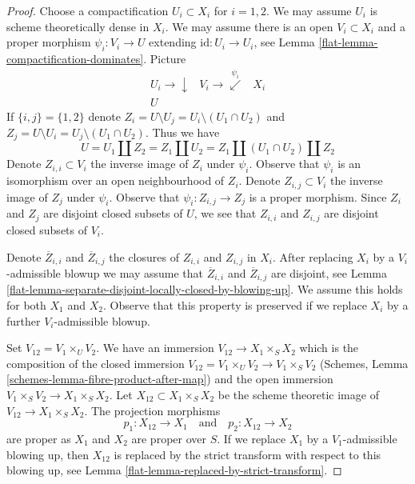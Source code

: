 \begin{proof}

Choose a compactification $U_i \subset X_i$ for $i = 1, 2$. We may
assume $U_i$ is scheme theoretically dense in $X_i$. We may assume there
is an open $V_i \subset X_i$ and a proper morphism
$\psi_i : V_i \to U$ extending $\text{id} : U_i \to U_i$, see
Lemma \ref{flat-lemma-compactification-dominates}. Picture
$$
\begin{array}{ccc}U_i \longrightarrow\downarrow & V_i \longrightarrow\overset{\psi_i}{\swarrow} & X_i \\ U &  & \end{array}
$$
If $\{i, j\} = \{1, 2\}$ denote
$Z_i = U \setminus U_j = U_i \setminus (U_1 \cap U_2)$
and
$Z_j = U \setminus U_i = U_j \setminus (U_1 \cap U_2)$.
Thus we have
$$
U = U_1 \amalg Z_2 = Z_1 \amalg U_2 = Z_1 \amalg (U_1 \cap U_2) \amalg Z_2
$$
Denote $Z_{i, i} \subset V_i$ the inverse image of $Z_i$ under $\psi_i$.
Observe that $\psi_i$ is an isomorphism over an open neighbourhood of $Z_i$.
Denote $Z_{i, j} \subset V_i$ the inverse image of $Z_j$ under $\psi_i$.
Observe that $\psi_i : Z_{i, j} \to Z_j$ is a proper morphism.
Since $Z_i$ and $Z_j$ are disjoint closed subsets of
$U$, we see that $Z_{i, i}$ and $Z_{i, j}$ are disjoint closed subsets
of $V_i$.

\medskip\noindent
Denote $\overline{Z}_{i, i}$ and $\overline{Z}_{i, j}$ the closures of
$Z_{i, i}$ and $Z_{i, j}$ in $X_i$. After replacing $X_i$ by a
$V_i$-admissible blowup we may assume that
$\overline{Z}_{i, i}$ and $\overline{Z}_{i, j}$ are disjoint, see
Lemma \ref{flat-lemma-separate-disjoint-locally-closed-by-blowing-up}.
We assume this holds for both $X_1$ and $X_2$.
Observe that this property is preserved if we replace $X_i$
by a further $V_i$-admissible blowup.

\medskip\noindent
Set $V_{12} = V_1 \times_U V_2$. We have an immersion
$V_{12} \to X_1 \times_S X_2$ which is the composition of the closed
immersion $V_{12} = V_1 \times_U V_2 \to V_1 \times_S V_2$
(Schemes, Lemma \ref{schemes-lemma-fibre-product-after-map})
and the open immersion $V_1 \times_S V_2 \to X_1 \times_S X_2$.
Let $X_{12} \subset X_1 \times_S X_2$ be the scheme theoretic
image of $V_{12} \to X_1 \times_S X_2$. The projection morphisms
$$
p_1 : X_{12} \to X_1
\quad\text{and}\quad
p_2 : X_{12} \to X_2
$$
are proper as $X_1$ and $X_2$ are proper over $S$. If we replace $X_1$ by a
$V_1$-admissible blowing up, then $X_{12}$ is replaced by
the strict transform with respect to this blowing up, see
Lemma \ref{flat-lemma-replaced-by-strict-transform}.


\end{proof}
